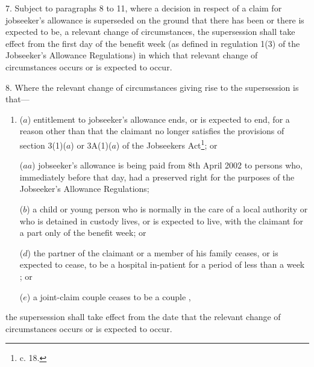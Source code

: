 \documentclass[12pt,a4paper]{article}
\begin{document}
7.  Subject to paragraphs 8 to 11, where a decision in respect of a claim for jobseeker’s allowance is superseded on the ground that there has been or there is expected to be, a relevant change of circumstances, the supersession shall take effect from the first day of the benefit week (as defined in regulation 1(3) of the Jobseeker’s Allowance Regulations) in which that relevant change of circumstances occurs or is expected to occur.

\medskip

8.  Where the relevant change of circumstances giving rise to the supersession is that—
\begin{enumerate}\item[]
($a$) entitlement to jobseeker’s allowance ends, or is expected to end, for a reason other than that the claimant no longer satisfies the provisions of section 3(1)($a$)  
or 3A(1)($a$)   %
of the Jobseekers Act\footnote{ c. 18.}; or

($aa$) jobseeker’s allowance is being paid from 8th April 2002 to persons who, immediately before that day, had a preserved right for the purposes of the Jobseeker’s Allowance Regulations;

($b$) a child or young person who is normally in the care of a local authority or who is detained in custody lives, or is expected to live, with the claimant for a part only of the benefit week; or


($d$) the partner of the claimant or a member of his family ceases, or is expected to cease, to be a hospital in-patient for a period of less than a week%
; or

    ($e$) 
    a joint-claim couple ceases to be 
a couple%
,
\end{enumerate}
the supersession shall take effect from the date that the relevant change of circumstances occurs or is expected to occur.

\end{document}
